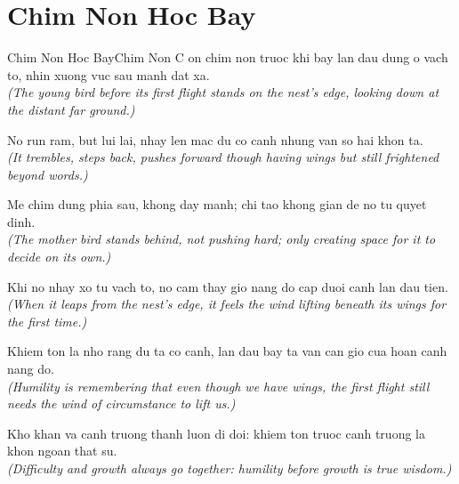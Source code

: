 \section{Chim Non Hoc Bay}
\begin{truyen}{Chim Non Hoc Bay}{Chim Non}
C on chim non truoc khi bay lan dau dung o vach to, nhin xuong vuc sau manh dat xa.\\
\textit{(The young bird before its first flight stands on the nest's edge, looking down at the distant far ground.)}

No run ram, but lui lai, nhay len mac du co canh nhung van so hai khon ta.\\
\textit{(It trembles, steps back, pushes forward though having wings but still frightened beyond words.)}

Me chim dung phia sau, khong day manh; chi tao khong gian de no tu quyet dinh.\\
\textit{(The mother bird stands behind, not pushing hard; only creating space for it to decide on its own.)}

Khi no nhay xo tu vach to, no cam thay gio nang do cap duoi canh lan dau tien.\\
\textit{(When it leaps from the nest's edge, it feels the wind lifting beneath its wings for the first time.)}

Khiem ton la nho rang du ta co canh, lan dau bay ta van can gio cua hoan canh nang do.\\
\textit{(Humility is remembering that even though we have wings, the first flight still needs the wind of circumstance to lift us.)}

\end{truyen}
\begin{baihoc}
  Kho khan va canh truong thanh luon di doi: khiem ton truoc canh truong la khon ngoan that su.\\
  \textit{(Difficulty and growth always go together: humility before growth is true wisdom.)}
\end{baihoc}

